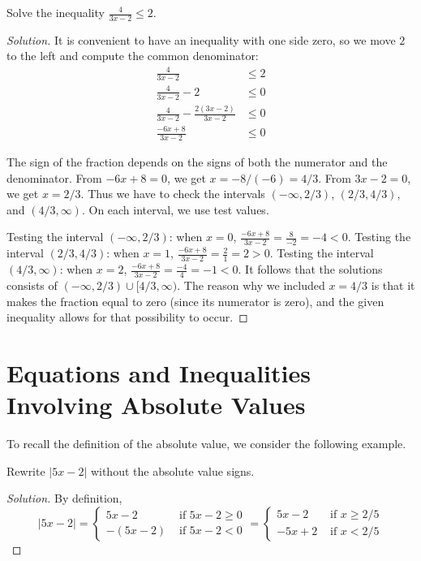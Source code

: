 \documentclass{ximera}
\begin{document}
\begin{example}
Solve the inequality $\displaystyle \frac{4}{3x-2} \leq 2$.
\end{example}

\begin{proof}[Solution]
It is convenient to have an inequality with one side zero, so we move $2$ to the left and compute the common denominator:
\begin{align*}
	\frac{4}{3x-2} & \leq 2\\
	\frac{4}{3x-2} - 2 & \leq 0\\
	\frac{4}{3x-2} - \frac{2(3x-2)}{3x-2} &\leq 0\\
	\frac{-6x+8}{3x-2} & \leq 0
\end{align*}

The sign of the fraction depends on the signs of both the numerator and the denominator.  From $-6x+8 = 0$, we get $x = -8/(-6) = 4/3$.  From $3x-2=0$, we get $x=2/3$.
Thus we have to check the intervals $(-\infty, 2/3)$, $(2/3, 4/3)$, and $(4/3, \infty)$.  On each interval, we use test values.

Testing the interval $(-\infty, 2/3)$: when $x=0$, $\frac{-6x+8}{3x-2} = \frac{8}{-2} = -4 < 0$.  Testing the interval $(2/3, 4/3)$: when $x=1$,
$\frac{-6x+8}{3x-2} = \frac{2}{1} = 2 > 0$.  Testing the interval $(4/3, \infty)$: when $x=2$, $\frac{-6x+8}{3x-2}=\frac{-4}{4} = -1 < 0$.
It follows that the solutions consists of $(-\infty, 2/3) \cup [4/3, \infty)$.  The reason why we included $x=4/3$ is that it makes the fraction equal to
zero (since its numerator is zero), and the given inequality allows for that possibility to occur.
\end{proof}

\section{Equations and Inequalities Involving Absolute Values}
To recall the definition of the absolute value, we consider the following example.
\begin{example}
Rewrite $|5x-2|$ without the absolute value signs.
\end{example}

\begin{proof}[Solution]
	By definition,
	\[ |5x-2| = \begin{cases} 5x-2 & \textrm{ if } 5x-2 \geq 0\\ -(5x-2) & \textrm{ if } 5x-2 < 0\end{cases}
		= \begin{cases} 5x-2 & \textrm{ if } x \geq 2/5 \\ -5x+2 & \textrm{ if } x < 2/5 \end{cases} \]
\end{proof}
\end{document}
